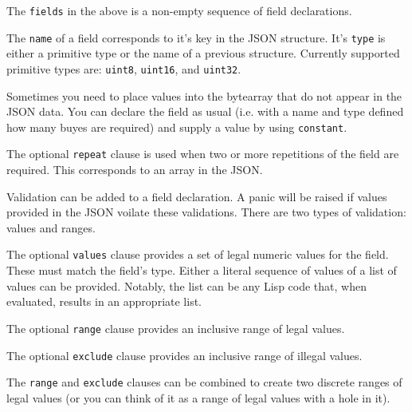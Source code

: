 \documentclass[12pt]{article}
\begin{document}
The \verb|fields| in the above is a non-empty sequence of field
declarations.


The \verb|name| of a field corresponds to it's key in the JSON
structure. It's \verb|type| is either a primitive type or the name of
a previous structure. Currently supported primitive types are:
\verb|uint8|, \verb|uint16|, and \verb|uint32|.


Sometimes you need to place values into the bytearray that do not
appear in the JSON data. You can declare the field as usual (i.e. with
a name and type defined how many buyes are required) and supply a
value by using \verb|constant|.


The optional \verb|repeat| clause is used when two or more repetitions
of the field are required. This corresponds to an array in the JSON.

Validation can be added to a field declaration. A panic will be raised if values provided in the JSON voilate these validations. There are two types of validation: values and ranges.


The optional \verb|values| clause provides a set of legal numeric values
for the field. These must match the field's type. Either a literal
sequence of values of a list of values can be provided. Notably, the
list can be any Lisp code that, when evaluated, results in an
appropriate list.


The optional \verb|range| clause provides an inclusive range of legal
values.


The optional \verb|exclude| clause provides an inclusive range of illegal
values.

The \verb|range| and \verb|exclude| clauses can be combined to create
two discrete ranges of legal values (or you can think of it as a range
of legal values with a hole in it).




\end{document}
